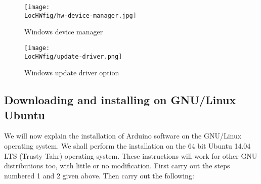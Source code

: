 \begin{figure}
      \centering
      \texttt{[image: \\LocHWfig/hw-device-manager.jpg]}
      \caption{Windows device manager}
      \label{win-device-manager}
\end{figure}

\begin{figure}
      \centering
      \texttt{[image: \\LocHWfig/update-driver.png]}
      \caption{Windows update driver option}
      \label{win-dri-update}
\end{figure}


\subsection{Downloading and installing on GNU/Linux Ubuntu}
We will now explain the installation of Arduino software on the
GNU/Linux operating system. We shall perform the installation on the 64
bit Ubuntu 14.04 LTS (Trusty Tahr) operating system.  These
instructions will work for other GNU distributions too, with little or
no modification.  First carry out the steps numbered 1 and 2 given
above.  Then carry out the following:

